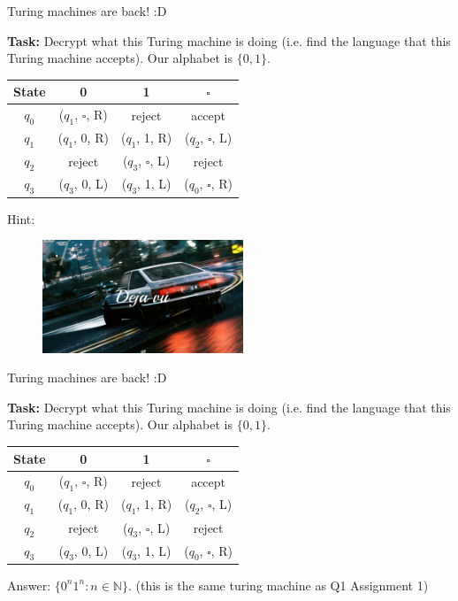 \documentclass{beamer}
\begin{document}
\begin{frame}{Turing machines are back! :D}

\textbf{Task:} Decrypt what this Turing machine is doing (i.e. find the language that this Turing machine accepts). Our alphabet is $\{0, 1\}$.

\begin{center}
\begin{tabular}{c|c|c|c}
State & 0 & 1 & $\square$\\
\hline
$q_0$ & ($q_1$, $\square$, R) & reject & accept\\
\hline
$q_1$ & ($q_1$, 0, R) & ($q_1$, 1, R) & ($q_2$, $\square$, L)\\
\hline
$q_2$ & reject & ($q_3$, $\square$, L) & reject\\
\hline
$q_3$ & ($q_3$, 0, L) & ($q_3$, 1, L) & ($q_0$, $\square$, R)\\
\end{tabular}
\end{center}

Hint: 

\begin{figure}[h]
\centering
\includegraphics[width=6cm]{img/dejavu.jpg}
\end{figure}

\end{frame}

\begin{frame}{Turing machines are back! :D}

\textbf{Task:} Decrypt what this Turing machine is doing (i.e. find the language that this Turing machine accepts). Our alphabet is $\{0, 1\}$.

\begin{center}
\begin{tabular}{c|c|c|c}
State & 0 & 1 & $\square$\\
\hline
$q_0$ & ($q_1$, $\square$, R) & reject & accept\\
\hline
$q_1$ & ($q_1$, 0, R) & ($q_1$, 1, R) & ($q_2$, $\square$, L)\\
\hline
$q_2$ & reject & ($q_3$, $\square$, L) & reject\\
\hline
$q_3$ & ($q_3$, 0, L) & ($q_3$, 1, L) & ($q_0$, $\square$, R)\\
\end{tabular}
\end{center}

Answer: $\{0^n 1^n: n \in \mathbb N\}$. (this is the same turing machine as Q1 Assignment 1)

\end{frame}
\end{document}
